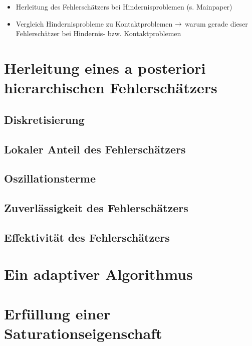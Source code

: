 
\begin{itemize}
\item Herleitung des Fehlerschätzers bei Hindernisproblemen (s. Mainpaper)
\item Vergleich Hindernisprobleme zu Kontaktproblemen $\rightarrow$ warum gerade dieser Fehlerschätzer bei Hindernis- bzw. Kontaktproblemen
\end{itemize}

\section{Herleitung eines a posteriori hierarchischen Fehlerschätzers}

\subsection{Diskretisierung}

\subsection{Lokaler Anteil des Fehlerschätzers}

\subsection{Oszillationsterme}

\subsection{Zuverlässigkeit des Fehlerschätzers}

\subsection{Effektivität des Fehlerschätzers}

\section{Ein adaptiver Algorithmus}

\section{Erfüllung einer Saturationseigenschaft}

\newpage

